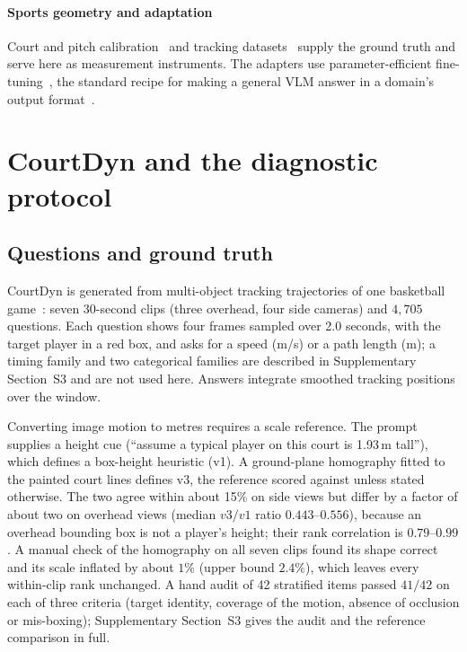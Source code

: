 \documentclass[preprint,number]{elsarticle}
\newcommand{\supp}[1]{Supplementary Section~S#1}
\begin{document}
\paragraph{Sports geometry and adaptation}
Court and pitch calibration~\cite{kalicalib2022,tvcalib2023,pnlcalib2026,%
sportcenter,calibprotocol2024} and tracking
datasets~\cite{teamtrack2024,deepsportradar2022,soccernetgsr2024} supply the
ground truth and serve here as measurement instruments. The adapters use
parameter-efficient fine-tuning~\cite{lora2022,qlora2023}, the standard recipe
for making a general VLM answer in a domain's output
format~\cite{deepseekmath2024,rlvrreasoning2025,rlvision2025}.

\section{CourtDyn and the diagnostic protocol}
\label{sec:courtdyn}

\subsection{Questions and ground truth}

CourtDyn is generated from multi-object tracking trajectories of one basketball
game~\cite{teamtrack2024}: seven 30-second clips (three overhead, four side
cameras) and $4{,}705$ questions. Each question shows four frames sampled over
2.0 seconds, with the target player in a red box, and asks for a speed (m/s) or
a path length (m); a timing family and two categorical families are described
in \supp{3} and are not used here. Answers integrate smoothed tracking positions over the window.

Converting image motion to metres requires a scale reference. The prompt
supplies a height cue (``assume a typical player on this court is 1.93\,m
tall''), which defines a box-height heuristic (v1). A ground-plane homography
fitted to the painted court lines defines v3, the reference scored against
unless stated otherwise. The two
agree within about 15\% on side views but differ by a factor of about two on
overhead views (median $v3/v1$ ratio $0.443$--$0.556$), because an overhead
bounding box is not a player's height; their rank correlation is
$0.79$--$0.99$. A manual check of the homography on all seven clips found its
shape correct and its scale inflated by about $1\%$ (upper bound $2.4\%$), which
leaves every within-clip rank unchanged. A hand audit of 42 stratified items
passed $41/42$ on each of three criteria (target identity, coverage of the
motion, absence of occlusion or mis-boxing); \supp{3} gives the audit and the
reference comparison in full.
\end{document}
